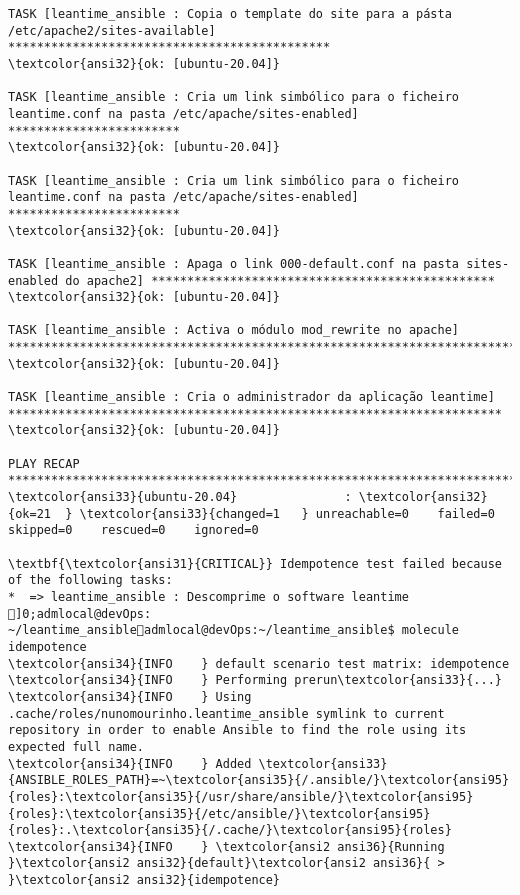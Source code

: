 \documentclass{scrartcl}
\begin{document}
\begin{Verbatim}
TASK [leantime_ansible : Copia o template do site para a pásta /etc/apache2/sites-available] *********************************************
\textcolor{ansi32}{ok: [ubuntu-20.04]}

TASK [leantime_ansible : Cria um link simbólico para o ficheiro leantime.conf na pasta /etc/apache/sites-enabled] ************************
\textcolor{ansi32}{ok: [ubuntu-20.04]}

TASK [leantime_ansible : Cria um link simbólico para o ficheiro leantime.conf na pasta /etc/apache/sites-enabled] ************************
\textcolor{ansi32}{ok: [ubuntu-20.04]}

TASK [leantime_ansible : Apaga o link 000-default.conf na pasta sites-enabled do apache2] ************************************************
\textcolor{ansi32}{ok: [ubuntu-20.04]}

TASK [leantime_ansible : Activa o módulo mod_rewrite no apache] **************************************************************************
\textcolor{ansi32}{ok: [ubuntu-20.04]}

TASK [leantime_ansible : Cria o administrador da aplicação leantime] *********************************************************************
\textcolor{ansi32}{ok: [ubuntu-20.04]}

PLAY RECAP *******************************************************************************************************************************
\textcolor{ansi33}{ubuntu-20.04}               : \textcolor{ansi32}{ok=21  } \textcolor{ansi33}{changed=1   } unreachable=0    failed=0    skipped=0    rescued=0    ignored=0

\textbf{\textcolor{ansi31}{CRITICAL}} Idempotence test failed because of the following tasks:
*  => leantime_ansible : Descomprime o software leantime
]0;admlocal@devOps: ~/leantime_ansibleadmlocal@devOps:~/leantime_ansible$ molecule idempotence
\textcolor{ansi34}{INFO    } default scenario test matrix: idempotence
\textcolor{ansi34}{INFO    } Performing prerun\textcolor{ansi33}{...}
\textcolor{ansi34}{INFO    } Using .cache/roles/nunomourinho.leantime_ansible symlink to current repository in order to enable Ansible to find the role using its expected full name.
\textcolor{ansi34}{INFO    } Added \textcolor{ansi33}{ANSIBLE_ROLES_PATH}=~\textcolor{ansi35}{/.ansible/}\textcolor{ansi95}{roles}:\textcolor{ansi35}{/usr/share/ansible/}\textcolor{ansi95}{roles}:\textcolor{ansi35}{/etc/ansible/}\textcolor{ansi95}{roles}:.\textcolor{ansi35}{/.cache/}\textcolor{ansi95}{roles}
\textcolor{ansi34}{INFO    } \textcolor{ansi2 ansi36}{Running }\textcolor{ansi2 ansi32}{default}\textcolor{ansi2 ansi36}{ > }\textcolor{ansi2 ansi32}{idempotence}


\end{Verbatim}
\end{document}
